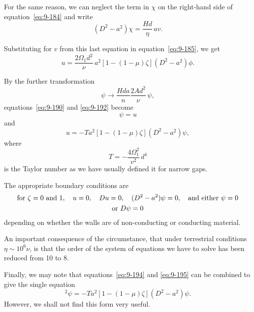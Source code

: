 For the same reason, we can neglect the term in $\chi$ on the right-hand side of equation~\eqref{eq:9-184} and write
\begin{equation}
(D^2 - a^2)\chi = \frac{Hd}{\eta}\, av. \label{eq:9-191}
\end{equation}

Substituting for $v$ from this last equation in equation~\eqref{eq:9-185}, we get
\begin{equation}
[(D^2 - a^2)^2 + Qa^2]u = \frac{2\Omega_1 d^2}{\nu}\, a^2[1-(1-\mu)\zeta](D^2 - a^2)\phi. \label{eq:9-192}
\end{equation}

By the further transformation
\begin{equation}
\psi \to \frac{Hda}{n}\frac{2Ad^2}{\nu}\, \psi, \label{eq:9-193}
\end{equation}
equations~\eqref{eq:9-190} and \eqref{eq:9-192} become
\begin{equation}
[(D^2 - a^2)^2 + Qa^2]\psi = u \label{eq:9-194}
\end{equation}
and
\begin{equation}
[(D^2 - a^2)^2 + Qa^2]u = -Ta^2[1 - (1-\mu)\zeta](D^2 - a^2)\psi, \label{eq:9-195}
\end{equation}
where
\begin{equation}
T = -\frac{4\Omega_1^2}{v^2}\, d^4 \label{eq:9-196}
\end{equation}
is the Taylor number as we have usually defined it for narrow gaps.

The appropriate boundary conditions are
\begin{gather}
\text{for } \zeta = 0 \text{ and } 1, \quad u = 0, \quad Du = 0, \quad (D^2 - a^2)\psi = 0, \quad \text{and either } \psi = 0 \notag \\
\text{or } D\psi = 0 \label{eq:9-197}
\end{gather}
depending on whether the walls are of non-conducting or conducting material.

An important consequence of the circumstance, that under terrestrial conditions $\eta \sim 10^6 \nu$, is that the order of the system of equations we have to solve has been reduced from 10 to 8.

Finally, we may note that equations~\eqref{eq:9-194} and \eqref{eq:9-195} can be combined to give the single equation
\begin{equation}
[(D^2 - a^2)^2 + Qa^2]^2\psi = -Ta^2[1 - (1-\mu)\zeta](D^2 - a^2)\psi. \label{eq:9-198}
\end{equation}
However, we shall not find this form very useful.


